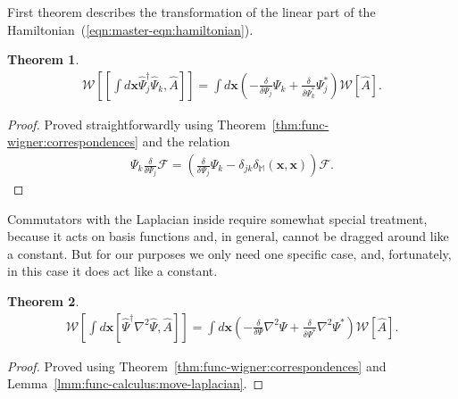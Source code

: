 \documentclass[12pt,aip,jmp,amssymb,amsmath]{revtex4-1}
\newcommand{\xvec}{\boldsymbol{x}}
\newcommand{\Psiop}{\hat{\Psi}}
\newcommand{\restbasis}{\mathbb{M}}
\newcommand{\eqnref}[1]{(\ref{eqn:#1})}
\newcommand{\thmref}[1]{Theorem~\ref{thm:#1}}
\newcommand{\lmmref}[1]{Lemma~\ref{lmm:#1}}
\newtheorem{theorem}{Theorem}
\begin{document}
First theorem describes the transformation of the linear part of the Hamiltonian~\eqnref{master-eqn:hamiltonian}.

\begin{theorem}
\label{thm:transformations:w-commutator1}
    \begin{equation*}\begin{split}
        \mathcal{W} \left[ [\int d\xvec \Psiop_j^\dagger \Psiop_k, \hat{A}] \right]
        = \int d\xvec \left(
            - \frac{\delta}{\delta \Psi_j} \Psi_k
            + \frac{\delta}{\delta \Psi_k^*} \Psi_j^*
        \right) \mathcal{W}[\hat{A}].
    \end{split}\end{equation*}
\end{theorem}
\begin{proof}
Proved straightforwardly using \thmref{func-wigner:correspondences} and the relation
\begin{equation}\begin{split}
    \Psi_k \frac{\delta}{\delta \Psi_j} \mathcal{F}
    = \left(
        \frac{\delta}{\delta \Psi_j} \Psi_k
        - \delta_{jk} \delta_{\restbasis}(\xvec, \xvec)
    \right) \mathcal{F}.
\end{split}\end{equation}
\end{proof}

Commutators with the Laplacian inside require somewhat special treatment, because it acts on basis functions and, in general, cannot be dragged around like a constant.
But for our purposes we only need one specific case, and, fortunately, in this case it does act like a constant.

\begin{theorem}
\label{thm:transformations:w-laplacian-commutator1}
    \begin{equation*}\begin{split}
        \mathcal{W} \left[
            \int d\xvec [\Psiop^\dagger \nabla^2 \Psiop, \hat{A}]
        \right]
        = \int d\xvec \left(
            - \frac{\delta}{\delta \Psi} \nabla^2 \Psi
            + \frac{\delta}{\delta \Psi^*} \nabla^2 \Psi^*
        \right) \mathcal{W}[\hat{A}].
    \end{split}\end{equation*}
\end{theorem}
\begin{proof}
Proved using \thmref{func-wigner:correspondences} and \lmmref{func-calculus:move-laplacian}.
\end{proof}
\end{document}

